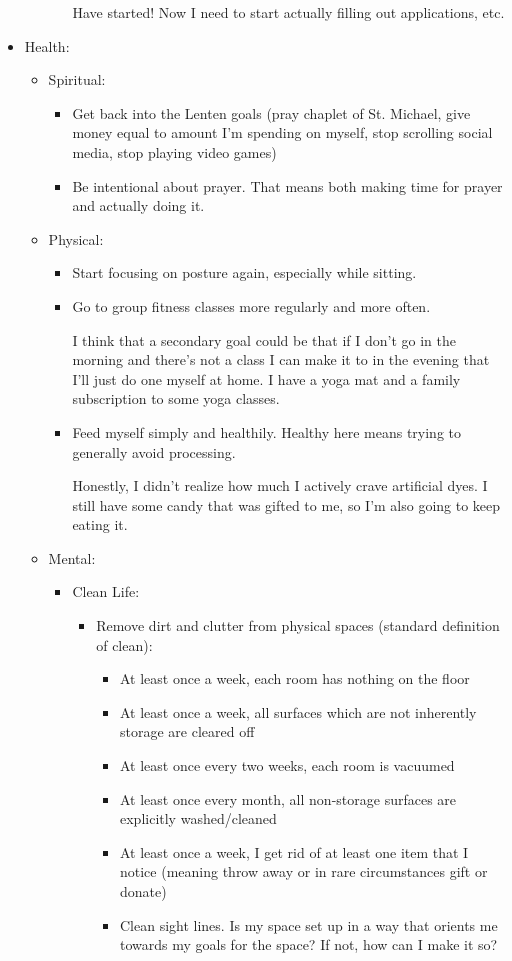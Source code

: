 \documentclass[12pt]{article}[titlepage]
\renewcommand{\,}{\textsuperscript{,}}
\begin{document}
\begin{itemize}
\begin{itemize}
\begin{itemize}
Have started! Now I need to start actually filling out applications, etc.  
\end{itemize}   
\end{itemize}   
\item Health:  
\begin{itemize}   
\item Spiritual:   
\begin{itemize}   
\item Get back into the Lenten goals (pray chaplet of St. Michael, give money equal to amount I'm spending on myself, stop scrolling social media, stop playing video games)  
\item Be intentional about prayer. That means both making time for prayer and actually doing it.  
\end{itemize}   
\item Physical:   
\begin{itemize}   
\item Start focusing on posture again, especially while sitting.  
\item Go to group fitness classes more regularly and more often.

I think that a secondary goal could be that if I don't go in the morning and there's not a class I can make it to in the evening that I'll just do one myself at home. I have a yoga mat and a family subscription to some yoga classes.  
\item Feed myself simply and healthily. Healthy here means trying to generally avoid processing.

Honestly, I didn't realize how much I actively crave artificial dyes. I still have some candy that was gifted to me, so I'm also going to keep eating it.  
\end{itemize}

\item Mental:   
\begin{itemize}  
\item Clean Life:   
\begin{itemize}   
\item Remove dirt and clutter from physical spaces (standard definition of clean):   
\begin{itemize}  
\item At least once a week, each room has nothing on the floor  
\item At least once a week, all surfaces which are not inherently storage are cleared off  
\item At least once every two weeks, each room is vacuumed  
\item At least once every month, all non-storage surfaces are explicitly washed/cleaned  
\item At least once a week, I get rid of at least one item that I notice (meaning throw away or in rare circumstances gift or donate)  
\item Clean sight lines. Is my space set up in a way that orients me towards my goals for the space? If not, how can I make it so?  
\end{itemize}


\end{itemize}
\end{itemize}
\end{itemize}
\end{itemize}
\end{document}
